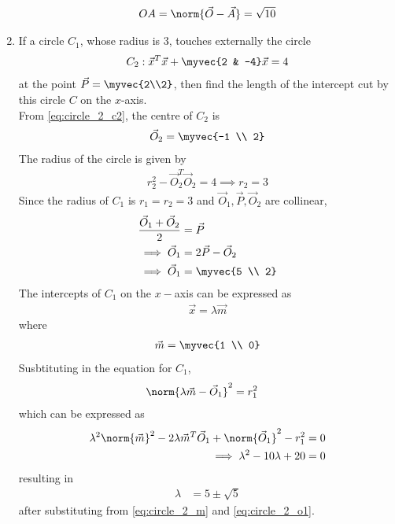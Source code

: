 \begin{enumerate}[label=\arabic*.,ref=\thesubsection.\theenumi]
\begin{align}
OA = \norm{\vec{O}-\vec{A}} = \sqrt{10}
\end{align}
\item If a circle $C_1$, whose radius is 3, touches externally the circle 
\begin{equation}
\label{eq:circle_2_c2}
C_2: \vec{x}^T\vec{x} + \myvec{2 & -4}\vec{x} = 4
\end{equation}
%
at the point $\vec{P}=\myvec{2\\2}$, then find the length of the intercept cut by this circle $C$ on the $x$-axis.
\\
\solution From \eqref{eq:circle_2_c2}, the centre of $C_2$ is 
\begin{align}
\label{eq:circle_2_o2}
\vec{O}_2 = \myvec{-1 \\ 2}
\end{align}
%
The radius of the circle is given by 
\begin{align}
\label{eq:circle_2_r2}
r_2^2-\vec{O}_2^T\vec{O}_2 = 4 \implies r_2 = 3
\end{align}
%
%
Since the radius of $C_1$ is $r_1=r_2=3$ and $\vec{O}_1, \vec{P}, \vec{O}_2$ are collinear, 
\begin{align}
\label{eq:circle_2_o1}
\frac{\vec{O}_1+\vec{O}_2}{2} &= \vec{P}
\nonumber \\
\implies \vec{O}_1 &= 2\vec{P}-\vec{O}_2
\nonumber \\
\implies \vec{O}_1 &= \myvec{5 \\ 2}
\end{align}
%
The intercepts of $C_1$ on the $x-$axis can be expressed as 
\begin{align}
\label{eq:circle_2_x}
\vec{x}=\lambda\vec{m}
\end{align}
%
where
\begin{align}
\label{eq:circle_2_m}
\vec{m}=\myvec{1 \\ 0}
\end{align}
Susbtituting in the equation for $C_1$,
\begin{align}
\norm{\lambda\vec{m}-\vec{O}_1}^2&=r_1^2
\end{align}
which can be expressed as
\begin{align}
\lambda^2\norm{\vec{m}}^2-2\lambda\vec{m}^T\vec{O}_1+ \norm{\vec{O}_1}^2-r_1^2&=0
\nonumber \\
\implies \lambda^2-10\lambda+ 20&=0
\end{align}
resulting in
\begin{align}
\lambda&=5\pm\sqrt{5}
\label{eq:circle_2_lam}
\end{align}
%
after substituting from \eqref{eq:circle_2_m} and \eqref{eq:circle_2_o1}.



\end{enumerate}
